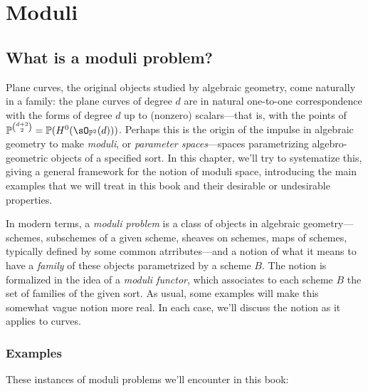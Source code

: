 

\chapter{Moduli} 
\label{Moduli chapter}\label{ModuliChapter}

\section{What is a moduli problem?}

Plane curves, the original objects studied by algebraic geometry, come naturally in a family: the plane curves of degree $d$
are in natural one-to-one correspondence with the forms of degree $d$ up to (nonzero) scalars---that is, with the points
of 
$\PP^{\binom{d+2}{2}} = \PP(H^0(\sO_{\PP^2}(d)))$.
Perhaps this is the origin of the impulse in algebraic geometry to make 
 \emph{moduli}, or \emph{parameter spaces}---spaces parametrizing algebro-geometric objects of a specified sort. In this chapter, we'll try to systematize this, giving a general framework for the notion of moduli space, introducing the main examples that we will treat in this book and their desirable or undesirable properties.

In modern terms, a \emph{moduli problem} is a class of objects in algebraic geometry---schemes, subschemes of a given scheme, sheaves on schemes, maps of schemes, typically defined by some common atrributes---and a notion of what it means to have a \emph{family} of these objects parametrized by a scheme $B$. The notion is formalized in the idea of a \emph{moduli functor}, 
which associates to each scheme $B$ the set of families of the given sort. As usual, some examples will make this somewhat vague notion more real. In each case, we'll discuss the notion as it applies to curves.

\subsection{Examples}

These instances of moduli problems we'll encounter in this book:

